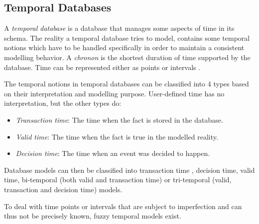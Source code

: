 \subsection{Temporal Databases}
A \emph{temporal database} is a database that manages some aspects of time in its schema. The reality a temporal database tries to model, contains some temporal notions which have to be handled specifically in order to maintain a consistent modelling behavior. A \emph{chronon} is the shortest duration of time supported by the database. Time can be represented either as points or intervals \cite{655777}.



The temporal notions in temporal databases can be classified into 4 types based on their interpretation and modelling purpose. User-defined time has no interpretation, but the other types do:

\begin{itemize}
	\item
	\emph{Transaction time}: The time when the fact is stored in the database.
	\item
	\emph{Valid time}: The time when the fact is true in the modelled reality.
	\item
	\emph{Decision time}: The time when an event was decided to happen. 
\end{itemize}
	
Database models can then be classified into transaction time \cite{Jensen91}, decision time, valid time, bi-temporal \cite{Snodgrass84}(both valid and transaction time) or tri-temporal \cite{Nascimento95} (valid, transaction and decision time) models.


To deal with time points \cite{Dubois89} or intervals \cite{Garrido2009} that are subject to imperfection and can thus not be precisely known, fuzzy temporal models \cite{schockaert08} exist. %
